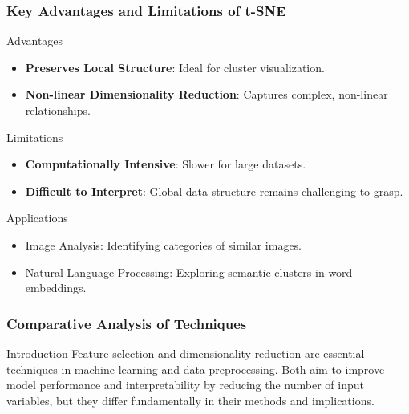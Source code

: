 \documentclass{beamer}
\begin{document}
\begin{frame}[fragile]
    \frametitle{Key Advantages and Limitations of t-SNE}
    \begin{block}{Advantages}
        \begin{itemize}
            \item \textbf{Preserves Local Structure}: Ideal for cluster visualization.
            \item \textbf{Non-linear Dimensionality Reduction}: Captures complex, non-linear relationships.
        \end{itemize}
    \end{block}
    
    \begin{block}{Limitations}
        \begin{itemize}
            \item \textbf{Computationally Intensive}: Slower for large datasets.
            \item \textbf{Difficult to Interpret}: Global data structure remains challenging to grasp.
        \end{itemize}
    \end{block}
    
    \begin{block}{Applications}
        \begin{itemize}
            \item Image Analysis: Identifying categories of similar images.
            \item Natural Language Processing: Exploring semantic clusters in word embeddings.
        \end{itemize}
    \end{block}
\end{frame}

\begin{frame}[fragile]
    \frametitle{Comparative Analysis of Techniques}
    \begin{block}{Introduction}
        Feature selection and dimensionality reduction are essential techniques in machine learning and data preprocessing. 
        Both aim to improve model performance and interpretability by reducing the number of input variables, but they differ fundamentally in their methods and implications.
    \end{block}
\end{frame}
\end{document}
